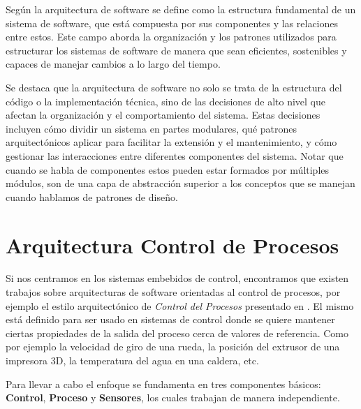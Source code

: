 Según \cite{ShawGarlan1996} la arquitectura de software se define como la estructura fundamental de un sistema de software, que está compuesta por sus componentes y las relaciones entre estos. Este campo aborda la organización y los patrones utilizados para estructurar los sistemas de software de manera que sean eficientes, sostenibles y capaces de manejar cambios a lo largo del tiempo.

Se destaca que la arquitectura de software no solo se trata de la estructura del código o la implementación técnica, sino de las decisiones de alto nivel que afectan la organización y el comportamiento del sistema. Estas decisiones incluyen cómo dividir un sistema en partes modulares, qué patrones arquitectónicos aplicar para facilitar la extensión y el mantenimiento, y cómo gestionar las interacciones entre diferentes componentes del sistema. Notar que cuando se habla de componentes estos pueden estar formados por múltiples módulos, son de una capa de abstracción superior a los conceptos que se manejan cuando hablamos de patrones de diseño.


\section{Arquitectura Control de Procesos}

Si nos centramos en los sistemas embebidos de control, encontramos que existen trabajos sobre arquitecturas de software orientadas al control de procesos, por ejemplo el estilo arquitectónico de \textit{Control del Procesos} presentado en \cite{ShawGarlan1996}. El mismo está definido para ser usado en sistemas de control donde se quiere mantener ciertas propiedades de la salida del proceso cerca de valores de referencia. Como por ejemplo la velocidad de giro de una rueda, la posición del extrusor de una impresora 3D, la temperatura del agua en una caldera, etc.

Para llevar a cabo el enfoque se fundamenta en tres componentes básicos: \textbf{Control}, \textbf{Proceso} y \textbf{Sensores}, los cuales trabajan de manera independiente.

